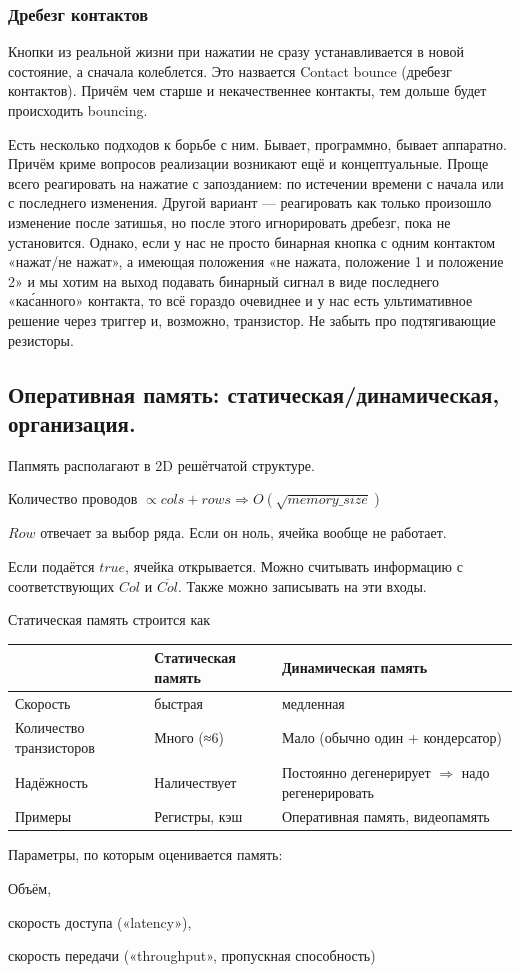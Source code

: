 \documentclass[12pt, a4paper]{article}
\begin{document}
\subsubsection{Дребезг контактов}

Кнопки из реальной жизни при нажатии не сразу устанавливается в новой состояние, а сначала колеблется. 
Это назвается Contact bounce (дребезг контактов). Причём чем старше и некачественнее контакты, тем дольше будет происходить bouncing.

Есть несколько подходов к борьбе с ним. Бывает, программно, бывает аппаратно.
Причём криме вопросов реализации возникают ещё и концептуальные. 
Проще всего реагировать на нажатие с запозданием: по истечении времени с начала или с последнего изменения.
Другой вариант — реагировать как только произошло изменение после затишья, но после этого игнорировать дребезг, пока не установится.
Однако, если у нас не просто бинарная кнопка с одним контактом «нажат/не нажат», 
а имеющая положения «не нажата, положение 1 и положение 2» и мы хотим на выход подавать бинарный сигнал в виде последнего «ка\'санного» контакта, 
то всё гораздо очевиднее и у нас есть ультимативное решение через триггер и, возможно, транзистор.
Не забыть про подтягивающие резисторы.




\subsection{Оперативная память: статическая/динамическая, организация.}

Папмять располагают в 2D решётчатой структуре.

Количество проводов $\propto cols + rows  \Rightarrow O(\sqrt{memory\_size})$

$Row$ отвечает за выбор ряда. Если он ноль, ячейка вообще не работает.

Если подаётся $true$, ячейка открывается. Можно считывать информацию с соответствующих $Col$ и $\overline{Col}$.
Также можно записывать на эти входы.

Статическая память строится как 

\begin{center}
    \begin{tabular}{|| m{10em} | m{10em} | m{12em} ||} 
     \hline
     &                          \textbf{Статическая память}  & \textbf{Динамическая память} \\ [0.5ex] 
     \hline\hline
     Скорость &                 быстрая             & медленная \\ 
     \hline 
     Количество транзисторов &  Много (≈6)          & Мало (обычно один + кондерсатор) \\ 
     \hline
     Надёжность &  Наличествует          & Постоянно дегенерирует $\Rightarrow$ надо регенерировать  \\
     \hline
     Примеры &  Регистры, кэш          & Оперативная память, видеопамять  \\
     \hline
    \end{tabular}
\end{center}

Параметры, по которым оценивается память:
\begin{center}
    Объём, 
    
    скорость доступа («latency»), 
    
    скорость передачи («throughput», пропускная способность)
\end{center}
\end{document}
